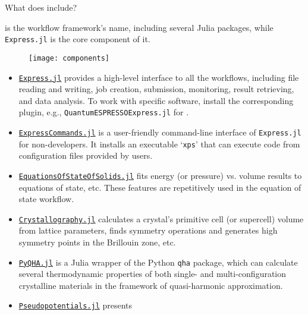 \begin{frame}[allowframebreaks]{What does \express{} include?}

    \express{} is the workflow framework's name, including several Julia packages,
    while \texttt{Express.jl} is the core component of it.

    \begin{figure}
        \centering
        \texttt{[image: components]}
        \label{fig:components}
    \end{figure}

    \begin{itemize}
        \item \href{https://github.com/MineralsCloud/Express.jl}{\texttt{Express.jl}}
              provides a high-level interface to all the
              workflows, including file reading and writing, job
              creation, submission, monitoring, result retrieving, and data
              analysis. To work with specific software, install the corresponding plugin,
              e.g., \texttt{QuantumESPRESSOExpress.jl} for \qe.
        \item \href{https://github.com/MineralsCloud/ExpressCommands.jl}{\texttt{ExpressCommands.jl}}
              is a user-friendly command-line interface of
              \texttt{Express.jl} for non-developers. It installs an executable
              `\texttt{xps}' that can execute code from configuration files provided by users.
        \item \href{https://github.com/MineralsCloud/EquationsOfStateOfSolids.jl}{\texttt{EquationsOfStateOfSolids.jl}}
              fits energy (or pressure) vs. volume results to equations of state,
              etc. These features are repetitively used in the equation of state workflow.
        \item \href{https://github.com/MineralsCloud/Crystallography.jl}{\texttt{Crystallography.jl}}
              calculates a crystal's primitive cell (or supercell) volume from lattice parameters, finds symmetry
              operations and generates high symmetry points in the Brillouin zone, etc.
        \item \href{https://github.com/MineralsCloud/PyQHA.jl}{\texttt{PyQHA.jl}}
              is a Julia wrapper of
              the Python \texttt{qha} package, which can calculate
              several thermodynamic properties of both single- and multi-configuration
              crystalline materials in the framework of quasi-harmonic approximation.
        \item \href{https://github.com/MineralsCloud/Pseudopotentials.jl}{\texttt{Pseudopotentials.jl}} presents

\end{itemize}
\end{frame}
